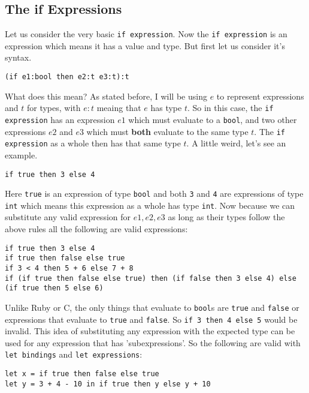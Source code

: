 \documentclass[main.tex]{subfiles}
\begin{document}
\subsection{The if Expressions}
Let us consider the very basic \texttt{if expression}. Now the \texttt{if expression} is an expression which means it has a value and type. But first let us consider it's syntax. 
\begin{lstlisting}[]
(if e1:bool then e2:t e3:t):t
\end{lstlisting}
What does this mean? As stated before, I will be using $e$ to represent expressions and $t$ for types, with $e:t$ meaing that $e$ has type $t$. So in this case, the \texttt{if expression} has an expression $e1$ which must evaluate to a \texttt{bool}, and two other expressions $e2$ and $e3$ which must \textbf{both} evaluate to the same type $t$. The \texttt{if expression}  as a whole then has that same type $t$. A little weird, let's see an example. 
\begin{lstlisting}[style=Myocamlstyle]
if true then 3 else 4
\end{lstlisting}
Here \texttt{true} is an expression of type \texttt{bool} and both \texttt{3} and \texttt{4} are expressions of type \texttt{int} which means this expression as a whole has type \texttt{int}. Now because we can substitute any valid expression for $e1,e2,e3$ as long as their types follow the above rules all the following are valid expressions:
\begin{lstlisting}[style=Myocamlstyle]
if true then 3 else 4
if true then false else true
if 3 < 4 then 5 + 6 else 7 + 8
if (if true then false else true) then (if false then 3 else 4) else (if true then 5 else 6)
\end{lstlisting}
Unlike Ruby or C, the only things that evaluate to \texttt{bool}s are \texttt{true} and \texttt{false} or expressions that evaluate to \texttt{true} and \texttt{false}. So \texttt{if 3 then 4 else 5} would be invalid. 
This idea of substituting any expression with the expected type can be used for any expression that has 'subexpressions'. So
the following are valid with \texttt{let bindings} and \texttt{let expressions}:
\begin{lstlisting}[style=Myocamlstyle]
let x = if true then false else true
let y = 3 + 4 - 10 in if true then y else y + 10
\end{lstlisting}
\end{document}
